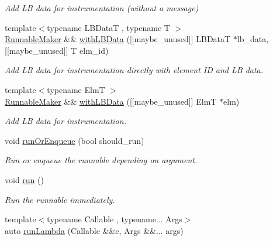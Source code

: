 \begin{DoxyCompactItemize}
\begin{DoxyCompactList}\small\item\em Add LB data for instrumentation (without a message) \end{DoxyCompactList}\item 
{\footnotesize template$<$typename L\+B\+DataT , typename T $>$ }\\\hyperlink{structvt_1_1runnable_1_1_runnable_maker}{Runnable\+Maker} \&\& \hyperlink{structvt_1_1runnable_1_1_runnable_maker_a1fcf95f42e474b61abd7978482d77b94}{with\+L\+B\+Data} (\mbox{[}\mbox{[}maybe\+\_\+unused\mbox{]}\mbox{]} L\+B\+DataT $\ast$lb\+\_\+data, \mbox{[}\mbox{[}maybe\+\_\+unused\mbox{]}\mbox{]} T elm\+\_\+id)
\begin{DoxyCompactList}\small\item\em Add LB data for instrumentation directly with element ID and LB data. \end{DoxyCompactList}\item 
{\footnotesize template$<$typename ElmT $>$ }\\\hyperlink{structvt_1_1runnable_1_1_runnable_maker}{Runnable\+Maker} \&\& \hyperlink{structvt_1_1runnable_1_1_runnable_maker_ab9519b248a7e3f37894de1dc956b5658}{with\+L\+B\+Data} (\mbox{[}\mbox{[}maybe\+\_\+unused\mbox{]}\mbox{]} ElmT $\ast$elm)
\begin{DoxyCompactList}\small\item\em Add LB data for instrumentation. \end{DoxyCompactList}\item 
void \hyperlink{structvt_1_1runnable_1_1_runnable_maker_aa0ae94d80e43385c18ee1e2afbce59a2}{run\+Or\+Enqueue} (bool should\+\_\+run)
\begin{DoxyCompactList}\small\item\em Run or enqueue the runnable depending on argument. \end{DoxyCompactList}\item 
void \hyperlink{structvt_1_1runnable_1_1_runnable_maker_a8fb3e1362dd6f746e991786654f5bd40}{run} ()
\begin{DoxyCompactList}\small\item\em Run the runnable immediately. \end{DoxyCompactList}\item 
{\footnotesize template$<$typename Callable , typename... Args$>$ }\\auto \hyperlink{structvt_1_1runnable_1_1_runnable_maker_a7f36cd1bb5c957840dfbe108fc1983f6}{run\+Lambda} (Callable \&\&c, Args \&\&... args)

\end{DoxyCompactItemize}
